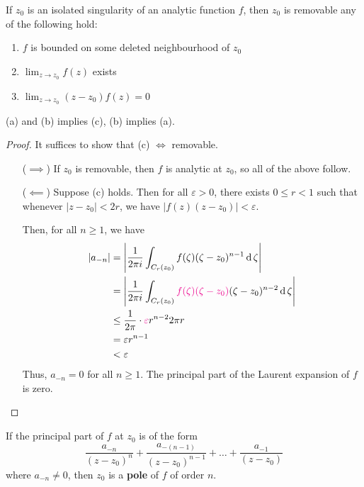 \documentclass[12pt]{article}
\renewcommand{\d}{\ensuremath{\operatorname{d}}}
\begin{document}
\begin{theorem}
    If $z_0$ is an isolated singularity of an analytic function $f$, then $z_0$ is removable \ifnif any of the following hold:\begin{enumerate}[label=(\alph*)]
        \item $f$ is bounded on some deleted neighbourhood of $z_0$
        \item $\lim_{z\to z_0}f(z)$ exists
        \item $\lim_{z\to z_0}(z-z_0)f(z)=0$
    \end{enumerate}
\end{theorem}
\rmk (a) and (b) implies (c), (b) implies (a).
\begin{proof}It suffices to show that (c) $\iff$ removable.
    \begin{enumerate}
        \item[($\implies$)] If $z_0$ is removable, then $f$ is analytic at $z_0$, so all of the above follow.
        
        \item[($\impliedby$)]  Suppose (c) holds. Then for all $\varepsilon>0$, there exists $0\leq r<1$ such that whenever $|z-z_0|<2r$, we have $|f(z)(z-z_0)|<\varepsilon$.
        
        Then, for all $n\geq 1$, we have \begin{align*}
            |a_{-n}|&=\left|\frac{1}{2\pi i}\int_{C_r(z_0)}f(\zeta)(\zeta-z_0)^{n-1}\d \zeta\right|\\
            &= \left|\frac{1}{2\pi i}\int_{C_r(z_0)}\rt{f(\zeta)(\zeta-z_0)}(\zeta-z_0)^{n-2}\d \zeta\right|\\
            &\leq \frac{1}{2\pi}\cdot \rt{\varepsilon}r^{n-2}2\pi r\\
            &= \varepsilon r^{n-1}\\
            &<\varepsilon
        \end{align*}
        Thus, $a_{-n}=0$ for all $n\geq 1$. The principal part of the Laurent expansion of $f$ is zero.
    \end{enumerate}
\end{proof}

 If the principal part of $f$ at $z_0$ is of the form \[\frac{a_{-n}}{(z-z_0)^{n}}+\frac{a_{-(n-1)}}{(z-z_0)^{n-1}}+\dots +\frac{a_{-1}}{(z-z_0)}\] where $a_{-n}\neq 0$, then $z_0$ is a \textbf{pole} of $f$ of order $n$.
\end{document}
